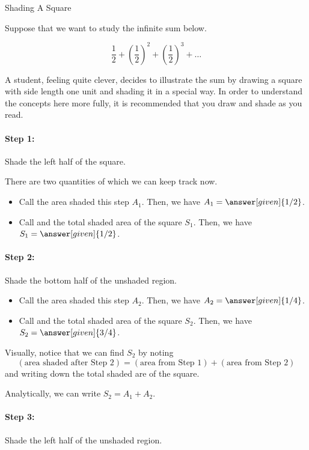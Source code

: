 \documentclass{ximera}
\begin{document}
\begin{example} Shading A Square

Suppose that we want to study the infinite sum below.

\[
\frac{1}{2} + \left(\frac{1}{2}\right)^2+ \left(\frac{1}{2}\right)^3+ \ldots
\]

A student, feeling quite clever, decides to illustrate the sum by drawing a square with side length one unit and shading it in a special way.  In order to understand the concepts here more fully, it is recommended that you draw and shade as you read.

\paragraph{Step 1:} Shade the left half of the square.  





There are two quantities of which we can keep track now.
\begin{itemize}
\item Call the area shaded this step $A_1$.  Then, we have $A_1=\answer[given]{1/2}$.
\item Call and the total shaded area  of the square $S_1$.  Then, we have $S_1=\answer[given]{1/2}$.
\end{itemize}

\paragraph{Step 2:} Shade the bottom half of the unshaded region.  






\begin{itemize}
\item Call the area shaded this step $A_2$.  Then, we have $A_2=\answer[given]{1/4}$.
\item Call and the total shaded area  of the square $S_2$.  Then, we have $S_2=\answer[given]{3/4}$.
\end{itemize}

Visually, notice that we can find $S_2$ by noting
$$( \textrm{area shaded after Step } 2) = ( \textrm{area from Step } 1) + (\textrm{area from Step } 2)$$
and writing down the total shaded are of the square.

Analytically, we can write $S_2=A_1+A_2.$

\paragraph{Step 3:} Shade the left half of the unshaded region.  





\end{example}
\end{document}
